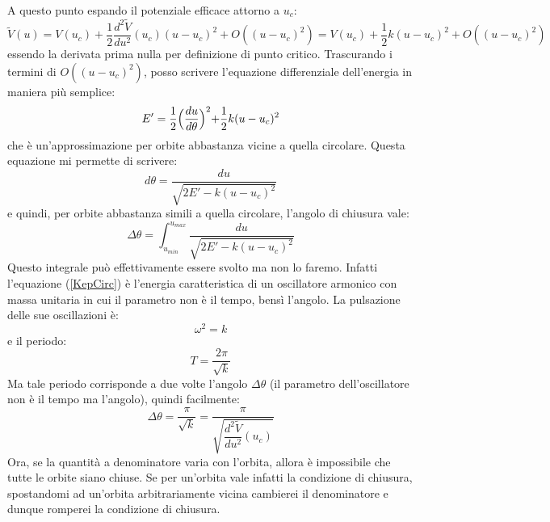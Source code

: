 \documentclass[a4paper,openany]{article}
\begin{document}
	A questo punto espando il potenziale efficace attorno a $u_c$:
	$$
	\tilde{V}(u) = V(u_c) + \dfrac{1}{2}\dfrac{d^2\tilde{V}}{du^2}(u_c)(u-u_c)^2 + O((u-u_c)^2) = V(u_c) + \dfrac{1}{2} k (u-u_c)^2 + O((u-u_c)^2) 
	$$
	essendo la derivata prima nulla per definizione di punto critico. Trascurando i termini di $O((u-u_c)^2)$, posso scrivere l'equazione differenziale dell'energia in maniera più semplice:
	\begin{equation}
		E' = \dfrac{1}{2}\Bigl(\dfrac{du}{d\theta}\Bigl)^2 + \dfrac{1}{2} k (u-u_c)^2
		\label{KepCirc}
	\end{equation}
	che è un'approssimazione per orbite abbastanza vicine a quella circolare. Questa equazione mi permette di scrivere:
	$$
	d\theta = \dfrac{du}{\sqrt{2E'-k(u-u_c)^2}}
	$$
	e quindi, per orbite abbastanza simili a quella circolare, l'angolo di chiusura vale:
	$$
	\Delta \theta =\int_{u_{min}}^{u_{max}} \dfrac{du}{\sqrt{2E' - k(u-u_c)^2}}
	$$
	Questo integrale può effettivamente essere svolto ma non lo faremo. Infatti l'equazione (\ref{KepCirc}) è l'energia caratteristica di un oscillatore armonico con massa unitaria in cui il parametro non è il tempo, bensì l'angolo. La pulsazione delle sue oscillazioni è:
	$$
	\omega^2 = k
	$$
	e il periodo:
	$$
	T = \dfrac{2\pi}{\sqrt{k}}
	$$
	Ma tale periodo corrisponde a due volte l'angolo $\Delta\theta$ (il parametro dell'oscillatore non è il tempo ma l'angolo), quindi facilmente:
	\begin{equation}\label{key}
		\Delta \theta = \dfrac{\pi}{\sqrt{k}} = \dfrac{\pi}{\sqrt{\dfrac{d^2\tilde{V}}{du^2}(u_c)}}
	\end{equation}
	Ora, se la quantità a denominatore varia con l'orbita, allora è impossibile che tutte le orbite siano chiuse. Se per un'orbita vale infatti la condizione di chiusura, spostandomi ad un'orbita arbitrariamente vicina cambierei il denominatore e dunque romperei la condizione di chiusura.
	
\end{document}
